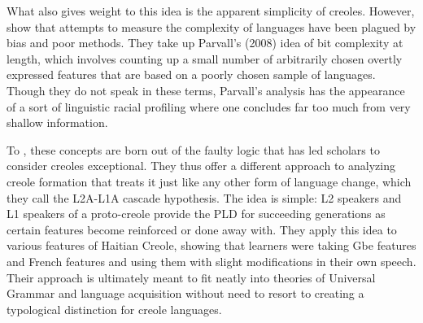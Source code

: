 \documentclass{article}
\begin{document}
    What also gives weight to this idea is the apparent simplicity of creoles.
    However, \textcite{roberts_null_2017} show that attempts to measure the complexity of languages have been plagued by bias and poor methods.
    They take up Parvall's (2008) idea of bit complexity at length, which involves counting up a small number of arbitrarily chosen overtly expressed features that are based on a poorly chosen sample of languages.
    Though they do not speak in these terms, Parvall's analysis has the appearance of a sort of linguistic racial profiling where one concludes far too much from very shallow information.

    To \textcite{roberts_null_2017}, these concepts are born out of the faulty logic that has led scholars to consider creoles exceptional.
    They thus offer a different approach to analyzing creole formation that treats it just like any other form of language change, which they call the L2A-L1A cascade hypothesis.
    The idea is simple: L2 speakers and L1 speakers of a proto-creole provide the PLD for succeeding generations as certain features become reinforced or done away with.
    They apply this idea to various features of Haitian Creole, showing that learners were taking Gbe features and French features and using them with slight modifications in their own speech.
    Their approach is ultimately meant to fit neatly into theories of Universal Grammar and language acquisition without need to resort to creating a typological distinction for creole languages.
    \printbibliography
\end{document}

